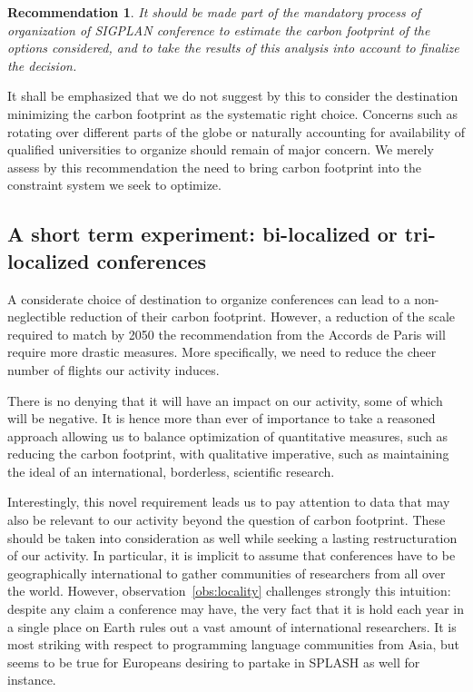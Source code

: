 \documentclass{scrartcl}
\newtheorem{recommend}{Recommendation}
\begin{document}
\begin{recommend}
It should be made part of the mandatory process of organization of SIGPLAN
conference to estimate the carbon footprint of the options considered, and
to take the results of this analysis into account to finalize the decision.
\end{recommend}

It shall be emphasized that we do not suggest by this to consider the destination
minimizing the carbon footprint as the systematic right choice. Concerns such as
rotating over different parts of the globe or naturally accounting for availability
of qualified universities to organize should remain of major concern. We merely
assess by this recommendation the need to bring carbon footprint into the constraint
system we seek to optimize.

\subsection{A short term experiment: bi-localized or tri-localized conferences}

A considerate choice of destination to organize conferences can lead to a
non-neglectible reduction of their carbon footprint. However, a reduction of
the scale required to match by 2050 the recommendation from the Accords de Paris
will require more drastic measures. More specifically, we need to reduce the cheer
number of flights our activity induces.

There is no denying that it will have an impact on our activity, some of which will
be negative. It is hence more than ever of importance to take a reasoned approach
allowing us to balance optimization of quantitative measures, such as reducing the
carbon footprint, with qualitative imperative, such as maintaining the ideal of
an international, borderless, scientific research.

Interestingly, this novel requirement leads us to pay attention to data that may also be
relevant to our activity beyond the question of carbon footprint. These should be
taken into consideration as well while seeking a lasting restructuration of our
activity. In particular, it is implicit to assume that conferences have to be
geographically international to gather communities of researchers from all over the
world. However, observation~\ref{obs:locality} challenges strongly this intuition:
despite any claim a conference may have, the very fact that it is hold each year in
a single place on Earth rules out a vast amount of international researchers. It is most
striking with respect to programming language communities from Asia, but seems to be
true for Europeans desiring to partake in SPLASH as well for instance.
\end{document}
